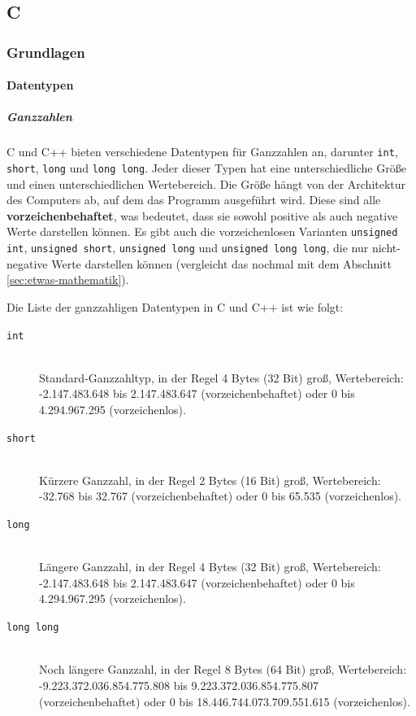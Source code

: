 \subsection{C}
\label{sec:referenz:c}

\subsubsection{Grundlagen}

\paragraph{Datentypen}
\label{sec:referenz:c:datentypen}

\subparagraph{Ganzzahlen}

C und C++ bieten verschiedene Datentypen für Ganzzahlen an, darunter \texttt{int}, \texttt{short}, \texttt{long} und \texttt{long long}. Jeder dieser Typen hat eine unterschiedliche Größe und einen unterschiedlichen Wertebereich. Die Größe hängt von der Architektur des Computers ab, auf dem das Programm ausgeführt wird. Diese sind alle \textbf{vorzeichenbehaftet}, was bedeutet, dass sie sowohl positive als auch negative Werte darstellen können. Es gibt auch die vorzeichenlosen Varianten \texttt{unsigned int}, \texttt{unsigned short}, \texttt{unsigned long} und \texttt{unsigned long long}, die nur nicht-negative Werte darstellen können (vergleicht das nochmal mit dem Abschnitt \ref{sec:etwas-mathematik}).

Die Liste der ganzzahligen Datentypen in C und C++ ist wie folgt:
\begin{description}
  \item[\texttt{int}]\hfill\\
   Standard-Ganzzahltyp, in der Regel 4 Bytes (32 Bit) groß, Wertebereich: -2.147.483.648 bis 2.147.483.647 (vorzeichenbehaftet) oder 0 bis 4.294.967.295 (vorzeichenlos).
  \item[\texttt{short}]\hfill\\
   Kürzere Ganzzahl, in der Regel 2 Bytes (16 Bit) groß, Wertebereich: -32.768 bis 32.767 (vorzeichenbehaftet) oder 0 bis 65.535 (vorzeichenlos).
  \item[\texttt{long}]\hfill\\
   Längere Ganzzahl, in der Regel 4 Bytes (32 Bit) groß, Wertebereich: -2.147.483.648 bis 2.147.483.647 (vorzeichenbehaftet) oder 0 bis 4.294.967.295 (vorzeichenlos).
  \item[\texttt{long long}]\hfill\\
   Noch längere Ganzzahl, in der Regel 8 Bytes (64 Bit) groß, Wertebereich: -9.223.372.036.854.775.808 bis 9.223.372.036.854.775.807 (vorzeichenbehaftet) oder 0 bis 18.446.744.073.709.551.615 (vorzeichenlos).
\end{description}

